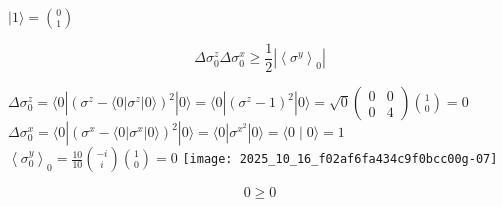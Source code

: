 $|1\rangle=\binom{0}{1}$

$$ \Delta \sigma_{0}^{z} \Delta \sigma_{0}^{x} \geqslant \frac{1}{2}\left|\left\langle\sigma^{y}\right\rangle_{0}\right| $$

$\Delta \sigma_{0}^{z}=\langle 0|\left(\sigma^{z}-\langle 0| \sigma^{z}|0\rangle\right)^{2}|0\rangle=\langle 0|\left(\sigma^{z}-1\right)^{2}|0\rangle=\sqrt{0}\left(\begin{array}{ll}0 & 0 \\ 0 & 4\end{array}\right)\binom{1}{0}=0$
$\Delta \sigma_{0}^{x}=\langle 0|\left(\sigma^{x}-\langle 0| \sigma^{x}|0\rangle\right)^{2}|0\rangle=\langle 0| \sigma^{x^{2}}|0\rangle=\langle 0 \mid 0\rangle=1$
$\left\langle\sigma_{0}^{y}\right\rangle_{0}=\frac{10}{10}\binom{-i}{i}\binom{1}{0}=0$
\texttt{[image: 2025\_10\_16\_f02af6fa434c9f0bcc00g-07]}

$$ 0 \geqslant 0 $$


